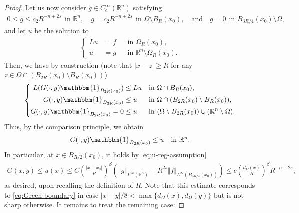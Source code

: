 \documentclass[10pt,a4paper]{amsart}
\newcommand{\R}{\mathbb{R}}
\begin{document}
\begin{proof}
Let us now consider $g \in C_c^{\infty}(\R^n)$ satisfying
\begin{align*}
    0 \le g \le c_2 R^{-n+2s} ~~\text{in } \R^n, \quad g = c_2 R^{-n+2s} ~~ \text{in } \Omega \setminus B_R(x_0), \quad\text{and}\quad g = 0~~ \text{in } B_{3R/4}(x_0) \setminus \Omega,
\end{align*}
and let $u$ be the solution to
\begin{align}\label{eq-Green-u}
\left\{
\begin{aligned}
L u &= f &&\text{in } \Omega_R(x_0),\\
u &= g &&\text{in } \R^n \setminus \Omega_R(x_0).
\end{aligned}
\right.
\end{align}
Then, we have by construction (note that $|x-z| \ge R$ for any $z \in \Omega \cap (B_{2R}(x_0) \setminus B_{R}(x_0))$)
\begin{align*}
\left\{
\begin{aligned}
L(G(\cdot,y)\mathbbm{1}_{B_{2R}(x_0)}) &\le Lu &&\text{in } \Omega \cap B_{R}(x_0),\\
G(\cdot,y)\mathbbm{1}_{B_{2R}(x_0)} &\le u &&\text{in } \Omega \cap (B_{2R}(x_0) \setminus B_{R}(x_0)),\\
G(\cdot,y)\mathbbm{1}_{B_{2R}(x_0)} = 0 &\le u &&\text{in } (\Omega \setminus B_{2R}(x_0)) \cup (\R^n \setminus \Omega).
\end{aligned}
\right.
\end{align*}
Thus, by the comparison principle, we obtain
\begin{align*}
G(\cdot,y)\mathbbm{1}_{B_{2R}(x_0)} \le u ~~ \text{ in } \R^n.
\end{align*}
In particular, at $x \in B_{R/2}(x_0)$, it holds by \eqref{eq:u-reg-assumption}
\begin{align*}
G(x,y) \le u(x) \le C \left( \frac{|x-x_0|}{R} \right)^{\beta} \left( \Vert g \Vert_{L^{\infty}(\R^n)} + R^{2s} \Vert f \Vert_{L^{\infty}(B_{3R/4}(x_0))} \right) \le c \left( \frac{d_{\Omega}(x)}{R} \right)^{\beta} R^{-n+2s},
\end{align*}
as desired, upon recalling the definition of $R$. Note that this estimate corresponds to \eqref{eq:Green-boundary} in case $|x-y|/8 < \max\{ d_{\Omega}(x) , d_{\Omega}(y) \}$ but is not sharp otherwise. It remains to treat the remaining case:


\end{proof}
\end{document}
